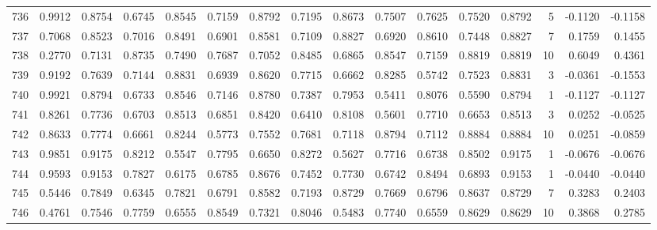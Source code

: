 \begin{tabular}{lrrrrrrrrrrrrrrr}
736 &      0.9912 &  0.8754 &  0.6745 &  0.8545 &  0.7159 &  0.8792 &  0.7195 &  0.8673 &  0.7507 &  0.7625 &   0.7520 &     0.8792 &      5 &                   -0.1120 &                    -0.1158 \\
737 &      0.7068 &  0.8523 &  0.7016 &  0.8491 &  0.6901 &  0.8581 &  0.7109 &  0.8827 &  0.6920 &  0.8610 &   0.7448 &     0.8827 &      7 &                    0.1759 &                     0.1455 \\
738 &      0.2770 &  0.7131 &  0.8735 &  0.7490 &  0.7687 &  0.7052 &  0.8485 &  0.6865 &  0.8547 &  0.7159 &   0.8819 &     0.8819 &     10 &                    0.6049 &                     0.4361 \\
739 &      0.9192 &  0.7639 &  0.7144 &  0.8831 &  0.6939 &  0.8620 &  0.7715 &  0.6662 &  0.8285 &  0.5742 &   0.7523 &     0.8831 &      3 &                   -0.0361 &                    -0.1553 \\
740 &      0.9921 &  0.8794 &  0.6733 &  0.8546 &  0.7146 &  0.8780 &  0.7387 &  0.7953 &  0.5411 &  0.8076 &   0.5590 &     0.8794 &      1 &                   -0.1127 &                    -0.1127 \\
741 &      0.8261 &  0.7736 &  0.6703 &  0.8513 &  0.6851 &  0.8420 &  0.6410 &  0.8108 &  0.5601 &  0.7710 &   0.6653 &     0.8513 &      3 &                    0.0252 &                    -0.0525 \\
742 &      0.8633 &  0.7774 &  0.6661 &  0.8244 &  0.5773 &  0.7552 &  0.7681 &  0.7118 &  0.8794 &  0.7112 &   0.8884 &     0.8884 &     10 &                    0.0251 &                    -0.0859 \\
743 &      0.9851 &  0.9175 &  0.8212 &  0.5547 &  0.7795 &  0.6650 &  0.8272 &  0.5627 &  0.7716 &  0.6738 &   0.8502 &     0.9175 &      1 &                   -0.0676 &                    -0.0676 \\
744 &      0.9593 &  0.9153 &  0.7827 &  0.6175 &  0.6785 &  0.8676 &  0.7452 &  0.7730 &  0.6742 &  0.8494 &   0.6893 &     0.9153 &      1 &                   -0.0440 &                    -0.0440 \\
745 &      0.5446 &  0.7849 &  0.6345 &  0.7821 &  0.6791 &  0.8582 &  0.7193 &  0.8729 &  0.7669 &  0.6796 &   0.8637 &     0.8729 &      7 &                    0.3283 &                     0.2403 \\
746 &      0.4761 &  0.7546 &  0.7759 &  0.6555 &  0.8549 &  0.7321 &  0.8046 &  0.5483 &  0.7740 &  0.6559 &   0.8629 &     0.8629 &     10 &                    0.3868 &                     0.2785 \\

\end{tabular}
